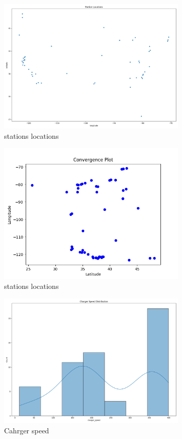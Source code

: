 \documentclass[12pt]{report}
\begin{document}
\vspace{1cm} %

\begin{figure}[h!]
    \centering
    \includegraphics[width=0.8\textwidth]{Figures/station_locations.png}
    \caption{stations locations}
    \label{fig:original_map}
\end{figure}

\begin{figure}[h!]
    \centering
    \includegraphics[width=0.8\textwidth]{Figures/convergence_plot.png}
    \caption{stations locations}
    \label{fig:original_map}
\end{figure}

\vspace{1cm} %

\begin{figure}[h!]
    \centering
    \includegraphics[width=0.8\textwidth]{Figures/charger_speed.png}
    \caption{Cahrger speed}
    \label{fig:Cahrger speed}
\end{figure}
\end{document}
